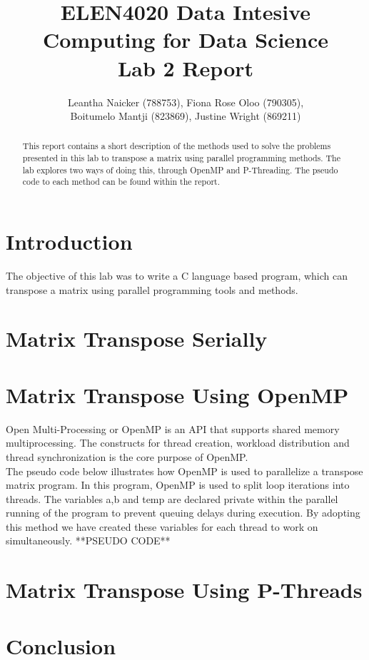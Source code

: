 \documentclass[10pt,a4paper]{article}
\title{\textbf{ELEN4020 Data Intesive Computing for Data Science\\Lab 2 Report}}
\author{Leantha Naicker (788753), Fiona Rose Oloo (790305),\\Boitumelo Mantji (823869), Justine Wright (869211)}
\affil{The University of Witwatersrand}
\begin{document}
\maketitle
\begin{abstract}
This report contains a short description of the methods used to solve the problems presented in this lab to transpose a matrix using parallel programming methods. The lab explores two ways of doing this, through OpenMP and P-Threading. The pseudo code to each method can be found within the report.
\end{abstract}

\section{Introduction}
The objective of this lab was to write a C language based program, which can transpose a matrix using parallel programming tools and methods. 

\section{Matrix Transpose Serially}

\section{Matrix Transpose Using OpenMP}
Open Multi-Processing or OpenMP is an API that supports shared memory multiprocessing. The constructs for thread creation, workload distribution and thread synchronization is the core purpose of OpenMP.\\
The pseudo code below illustrates how OpenMP is used to parallelize a transpose matrix program. In this program, OpenMP is used to split loop iterations into threads. The variables a,b and temp are declared private within the parallel running of the program to prevent queuing delays during execution. By adopting this method we have created these variables for each thread to work on simultaneously. 
**PSEUDO CODE**

\section{Matrix Transpose Using P-Threads}


\section{Conclusion}
\end{document}
